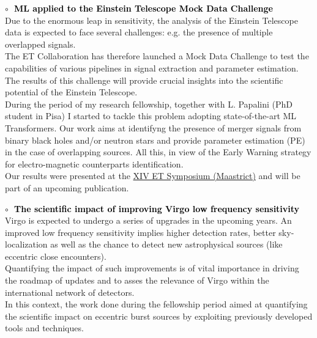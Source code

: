 \textbf{\textcolor{black}{\hspace{0.4cm}$\circ\;$ ML applied to the Einstein Telescope Mock Data Challenge}}\vspace{0.05cm}\\
\indent Due to the enormous leap in sensitivity, the analysis of the Einstein Telescope data is
expected to face several challenges: e.g. the presence of multiple overlapped signals.\\
The ET Collaboration has therefore launched a Mock Data Challenge to test the capabilities of
various pipelines in signal extraction and parameter estimation. The results of this challenge
will provide crucial insights into the scientific potential of the Einstein Telescope.\\
During the period of my research fellowship, together with L. Papalini (PhD student in Pisa) I
started to tackle this problem adopting state-of-the-art ML Transformers. Our work aims at
identifyng the presence of merger signals from binary black holes and/or neutron stars and
provide parameter estimation (PE) in the case of overlapping sources. All this, in view of the Early Warning
strategy for electro-magnetic counterparts identification.\\
Our results were presented at the \href{https://indico.ego-gw.it/event/710/}{XIV ET Symposium (Maastrict)} and will be 
part of an upcoming publication.

\medskip

\textbf{\textcolor{black}{\hspace{0.4cm}$\circ\;$ The scientific impact of improving Virgo low frequency sensitivity}}\vspace{0.05cm}\\
\indent Virgo is expected to undergo a series of upgrades in the upcoming years. An improved low
frequency sensitivity implies higher detection rates, better sky-localization as well as the
chance to detect new astrophysical sources (like eccentric close encounters).\\
Quantifying the impact of such improvements is of vital importance in driving the roadmap of
updates and to asses the relevance of Virgo within the international network of detectors.\\
In this context, the work done during the fellowship period aimed at quantifying 
the scientific impact on eccentric burst sources by exploiting previously
developed tools and techniques.

\medskip

